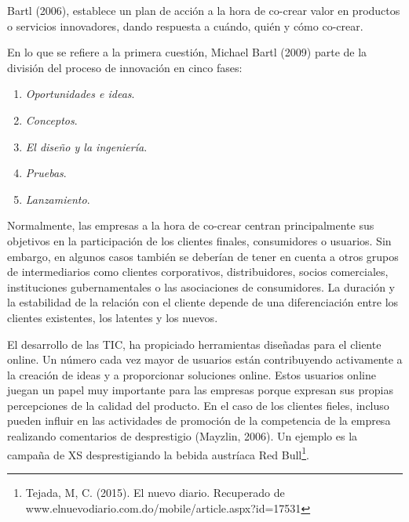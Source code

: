 Bartl (2006), establece un plan de acción a la hora de co-crear valor en productos o servicios innovadores, dando respuesta a cuándo, quién y cómo co-crear.

En lo que se refiere a la primera cuestión, Michael Bartl (2009) parte de la división del proceso de innovación en cinco fases:

\begin{enumerate}
	\item \emph{Oportunidades e ideas}.
	\item \emph{Conceptos}.
	\item \emph{El diseño y la ingeniería}.
	\item \emph{Pruebas}.
	\item \emph{Lanzamiento}.
\end{enumerate}

Normalmente, las empresas a la hora de co-crear centran principalmente sus objetivos en la participación de los clientes finales, consumidores o usuarios. Sin embargo, en algunos casos también se deberían de tener en cuenta a otros grupos de intermediarios como clientes corporativos, distribuidores, socios comerciales, instituciones gubernamentales o las asociaciones de consumidores. La duración y la estabilidad de la relación con el cliente depende de una diferenciación entre los clientes existentes, los latentes y los nuevos.

El desarrollo de las TIC, ha propiciado herramientas diseñadas para el cliente online. Un número cada vez mayor de usuarios están contribuyendo activamente a la creación de ideas y a proporcionar soluciones online. Estos usuarios online juegan un papel muy importante para las empresas porque expresan sus propias percepciones de la calidad del producto. En el caso de los clientes fieles, incluso pueden influir en las actividades de promoción de la competencia de la empresa realizando comentarios de desprestigio (Mayzlin, 2006). Un ejemplo es la campaña de XS desprestigiando la bebida austríaca Red Bull\footnote{Tejada, M, C. (2015). El nuevo diario. Recuperado de www.elnuevodiario.com.do/mobile/article.aspx?id=17531}.

